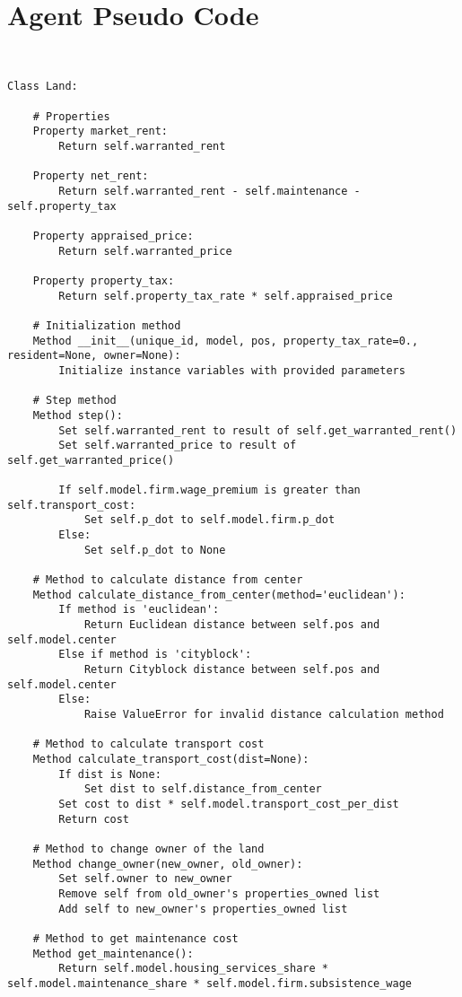 \section{Agent Pseudo Code}
{\tiny\begin{verbatim} 


Class Land:

    # Properties
    Property market_rent:
        Return self.warranted_rent

    Property net_rent:
        Return self.warranted_rent - self.maintenance - self.property_tax

    Property appraised_price:
        Return self.warranted_price

    Property property_tax:
        Return self.property_tax_rate * self.appraised_price

    # Initialization method
    Method __init__(unique_id, model, pos, property_tax_rate=0., resident=None, owner=None):
        Initialize instance variables with provided parameters

    # Step method
    Method step():
        Set self.warranted_rent to result of self.get_warranted_rent()
        Set self.warranted_price to result of self.get_warranted_price()
        
        If self.model.firm.wage_premium is greater than self.transport_cost:
            Set self.p_dot to self.model.firm.p_dot
        Else:
            Set self.p_dot to None

    # Method to calculate distance from center
    Method calculate_distance_from_center(method='euclidean'):
        If method is 'euclidean':
            Return Euclidean distance between self.pos and self.model.center
        Else if method is 'cityblock':
            Return Cityblock distance between self.pos and self.model.center
        Else:
            Raise ValueError for invalid distance calculation method

    # Method to calculate transport cost
    Method calculate_transport_cost(dist=None):
        If dist is None:
            Set dist to self.distance_from_center
        Set cost to dist * self.model.transport_cost_per_dist
        Return cost

    # Method to change owner of the land
    Method change_owner(new_owner, old_owner):
        Set self.owner to new_owner
        Remove self from old_owner's properties_owned list
        Add self to new_owner's properties_owned list

    # Method to get maintenance cost
    Method get_maintenance():
        Return self.model.housing_services_share * self.model.maintenance_share * self.model.firm.subsistence_wage


\end{verbatim}}
